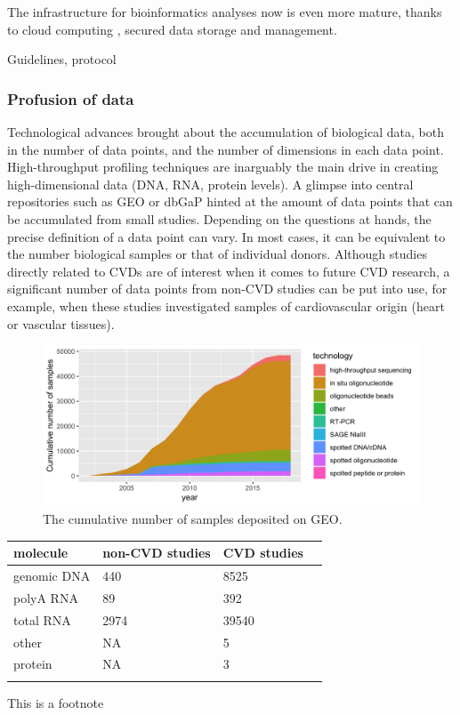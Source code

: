 \documentclass[letter]{bioinfo}
\begin{document}
The infrastructure for bioinformatics analyses now is even more mature, thanks to cloud computing \citep{Langmead:2018:Cloud}, secured data storage and management.

Guidelines, protocol



\subsubsection{Profusion of data}

Technological advances brought about the accumulation of biological data, both in the number of data points, and the number of dimensions in each data point.
High-throughput profiling techniques are inarguably the main drive in creating high-dimensional data (DNA, RNA, protein levels).
A glimpse into central repositories such as GEO or dbGaP hinted at the amount of data points that can be accumulated from small  studies. Depending on the questions at hands, the precise definition of a data point can vary. In most cases, it can be equivalent to the number biological samples or that of individual donors. Although studies directly related to CVDs are of interest when it comes to future CVD research, a significant number of data points from non-CVD studies can be put into use, for example, when these studies investigated samples of cardiovascular origin (heart or vascular tissues).

\begin{figure}[!tpb]%
	\includegraphics[width=1\linewidth]{gsm_count_by_tech.png}
	\caption{The cumulative number of samples deposited on GEO.}
	\label{fig:01}
\end{figure}

\begin{table}[!t]
	 {\begin{tabular}{@{}llll@{}}\toprule 
			molecule &non-CVD studies & CVD studies \\ \midrule
			genomic DNA &            440 &        8525  \\
			polyA RNA &             89 &         392  \\
			total RNA &           2974 &       39540  \\
			other &             NA &           5  \\
			protein &             NA &           3  \\ \botrule
	\end{tabular}}{This is a footnote}
\end{table}
\end{document}
